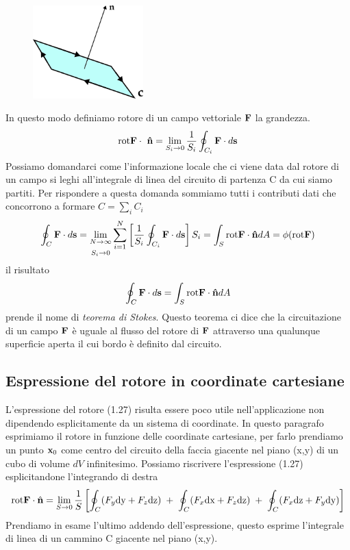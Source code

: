 \begin{figure}
    \centering
    \includegraphics[width=0.38\textwidth]{images/direc} %
\end{figure}
In questo modo definiamo rotore di un campo vettoriale $\bold{F}$ la grandezza.
\begin{equation}
	\text{rot}\bold{F} \cdot \ \bold{\hat{n}} = \lim_{S_i \to 0} \frac{1}{S_i} \oint_{C_i} \bold{F} \cdot d \bold{s}
\end{equation}
Possiamo domandarci come l'informazione locale che ci viene data dal rotore di un campo si leghi all'integrale di linea del circuito di partenza C da cui siamo partiti. Per rispondere a questa domanda sommiamo tutti i contributi dati che concorrono a formare $C = \sum_i C_i$ 
\begin{equation*}
	\oint_{C} \bold{F} \cdot d \bold{s} = \lim_{\substack{N \to \infty \\[0.2cm] S_i \to 0}} \sum_{i=1}^N \left [\frac{1}{S_i} \oint_{C_i} \bold{F} \cdot d \bold{s} \right ] S_i = \int_S \text{rot}\bold{F}\cdot\bold{\hat{n}}dA = \phi(\text{rot}\bold{F})
\end{equation*}
il risultato
\begin{equation}
	\oint_{C} \bold{F} \cdot d \bold{s} = \int_S \text{rot}\bold{F}\cdot\bold{\hat{n}}dA 
\end{equation}
prende il nome di \textit{teorema di Stokes}. Questo teorema ci dice che la circuitazione di un campo $\bold{F}$ \`e uguale al flusso del rotore di $\bold{F}$ attraverso una qualunque superficie aperta il cui bordo \`e definito dal circuito.

\subsection{Espressione del rotore in coordinate cartesiane}

L'espressione del rotore (1.27) risulta essere poco utile nell'applicazione non dipendendo esplicitamente da un sistema di coordinate. In questo paragrafo esprimiamo il rotore in funzione delle coordinate cartesiane, per farlo prendiamo un punto $\bold{x}_0$ come centro del circuito della faccia giacente nel piano (x,y) di un cubo di volume $dV$ infinitesimo. Possiamo riscrivere l'espressione (1.27) esplicitandone l'integrando di destra 
\begin{equation*}
	\text{rot} \bold{F} \cdot \hat{\bold{n}} = \lim_{S \to 0} \frac{1}{S} \left [ \oint_{C} (F_{y}\text{dy}+F_z\text{dz}) \; +\; \oint_{C} (F_x\text{dx}+F_z\text{dz}) \; + \; \oint_{C}(F_x\text{dz} + F_y\text{dy})\right ]
\end{equation*}
Prendiamo in esame l'ultimo addendo dell'espressione, questo esprime l'integrale di linea di un cammino C giacente nel piano (x,y). 
\newpage

